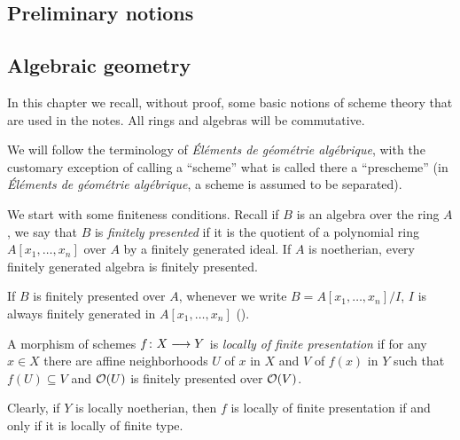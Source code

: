 \begin{1   PRELIMINARY NOTIONS}
\setcounter{chapter}{0}
\chapter{Preliminary notions} \label{ch:recall}
\begin{1.1 Algebraic geometry}
\setcounter{section}{0}
\section{Algebraic geometry}

In this chapter we recall, without proof, some basic notions of scheme theory that are used in the notes. All rings and algebras will be commutative.

We will follow the terminology of \emph{\'{E}l\'ements de g\'eom\'etrie alg\'ebrique}, with the customary exception of calling a ``scheme'' what is called there a ``prescheme'' (in \emph{\'{E}l\'ements de g\'eom\'etrie alg\'ebrique}, a scheme is assumed to be separated).

We start with some finiteness conditions. Recall if $B$ is an algebra over the ring $A$, we say that $B$ is \emph{finitely presented} if it is the quotient of a polynomial ring $A[x_1, \dots, x_n]$ over $A$ by a finitely generated ideal. If $A$ is noetherian, every finitely generated algebra is finitely presented.

If $B$ is finitely presented over $A$, whenever we write $B = A[x_1, \dots, x_n]/I$, $I$ is always finitely generated in $A[x_1, \dots, x_n]$ (\cite[Proposition~1.4.4]{ega4-1}).

\begin{definition}
A morphism of schemes $f \colon X \arr Y$ is \emph{locally of finite presentation}
if for any $x \in X$ there are affine neighborhoods $U$ of $x$ in $X$ and $V$ of $f(x)$ in $Y$ such that $f(U) \subseteq V$ and $\mathcal{O}(U)$ is finitely presented over $\mathcal{O}(V)$.
\end{definition}

Clearly, if $Y$ is locally noetherian, then $f$ is locally of finite presentation if and only if it is locally of finite type.

\begin{proposition}\hfil
\begin{enumeratei}


\end{enumeratei}
\end{proposition}
\end{1.1 Algebraic geometry}
\end{1   PRELIMINARY NOTIONS}
